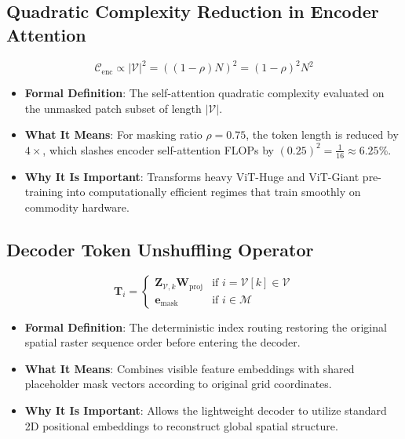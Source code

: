 \documentclass[11pt,a4paper]{article}
\theoremstyle{definition}
\begin{document}
\subsection{Quadratic Complexity Reduction in Encoder Attention}
{\boldmath
\begin{equation}
\mathcal{C}_{\text{enc}} \propto |\mathcal{V}|^2 = \left( (1 - \rho) N \right)^2 = (1 - \rho)^2 N^2
\end{equation}
}
\begin{itemize}
    \item \textbf{Formal Definition}: The self-attention quadratic complexity evaluated on the unmasked patch subset of length $|\mathcal{V}|$.
    \item \textbf{What It Means}: For masking ratio $\rho = 0.75$, the token length is reduced by $4\times$, which slashes encoder self-attention FLOPs by $(0.25)^2 = \frac{1}{16} \approx 6.25\%$.
    \item \textbf{Why It Is Important}: Transforms heavy ViT-Huge and ViT-Giant pre-training into computationally efficient regimes that train smoothly on commodity hardware.
\end{itemize}

\subsection{Decoder Token Unshuffling Operator}
{\boldmath
\begin{equation}
\mathbf{T}_i = \begin{cases} \mathbf{Z}_{\mathcal{V}, k} \mathbf{W}_{\text{proj}} & \text{if } i = \mathcal{V}[k] \in \mathcal{V} \\ \mathbf{e}_{\text{mask}} & \text{if } i \in \mathcal{M} \end{cases}
\end{equation}
}
\begin{itemize}
    \item \textbf{Formal Definition}: The deterministic index routing restoring the original spatial raster sequence order before entering the decoder.
    \item \textbf{What It Means}: Combines visible feature embeddings with shared placeholder mask vectors according to original grid coordinates.
    \item \textbf{Why It Is Important}: Allows the lightweight decoder to utilize standard 2D positional embeddings to reconstruct global spatial structure.
\end{itemize}
\end{document}
